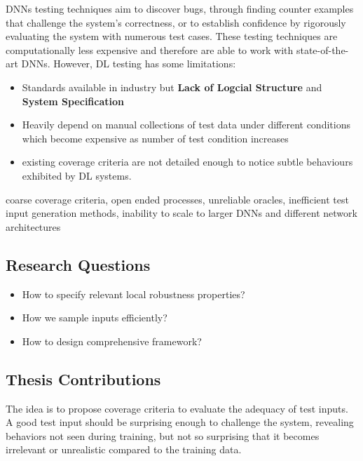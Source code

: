 DNNs testing techniques aim to discover bugs, through finding counter examples that challenge the system's correctness, or to establish confidence by rigorously evaluating the system with numerous test cases. These testing techniques are computationally less expensive and therefore are able to work with state-of-the- art DNNs. However, DL testing has some limitations:
\begin{itemize}
    \item Standards available in industry but \textbf{Lack of Logcial Structure} and \textbf{System Specification}  
     \item Heavily depend on manual collections of test data under different conditions which become expensive as number of test condition increases
     \item  existing coverage criteria are not detailed enough to notice subtle behaviours exhibited by DL systems.
\end{itemize}

coarse coverage criteria, open ended processes, unreliable
oracles, inefficient test input generation methods, inability to
scale to larger DNNs and different network architectures


		
		
\subsection{Research Questions}\hypertarget{researchquestions}{}
\begin{itemize}
	\item How to specify relevant local robustness properties?
	\item How we sample inputs efficiently?
	\item How to design comprehensive framework?
   \end{itemize}


\subsection{Thesis Contributions}\hypertarget{contributions}{}
The idea is to propose coverage criteria to evaluate the adequacy of test inputs. A good test input should be surprising enough to challenge the system, revealing behaviors not seen during training, but not so surprising that it becomes irrelevant or unrealistic compared to the training data.

